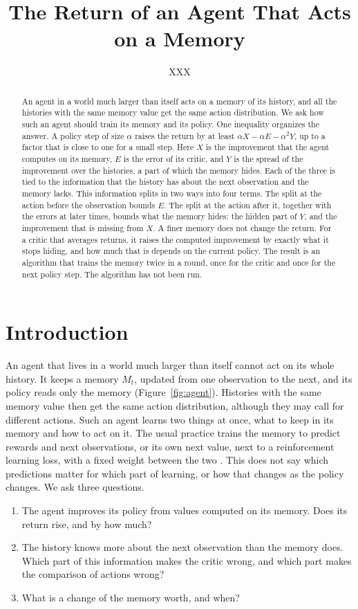 \documentclass{article}
\title{The Return of an Agent That Acts on a Memory}
\author{XXX}
\newcounter{algo}
\theoremstyle{definition}
\begin{document}
\maketitle

\begin{abstract}
An agent in a world much larger than itself acts on a memory of its history, and all the histories with the same memory value get the same action distribution. We ask how such an agent should train its memory and its policy. One inequality organizes the answer. A policy step of size $\alpha$ raises the return by at least $\alpha X-\alpha E-\alpha^2Y$, up to a factor that is close to one for a small step. Here $X$ is the improvement that the agent computes on its memory, $E$ is the error of its critic, and $Y$ is the spread of the improvement over the histories, a part of which the memory hides. Each of the three is tied to the information that the history has about the next observation and the memory lacks. This information splits in two ways into four terms. The split at the action before the observation bounds $E$. The split at the action after it, together with the errors at later times, bounds what the memory hides: the hidden part of $Y$, and the improvement that is missing from $X$. A finer memory does not change the return. For a critic that averages returns, it raises the computed improvement by exactly what it stops hiding, and how much that is depends on the current policy. The result is an algorithm that trains the memory twice in a round, once for the critic and once for the next policy step. The algorithm has not been run.
\end{abstract}

\section{Introduction}

An agent that lives in a world much larger than itself cannot act on its whole history. It keeps a memory $M_t$, updated from one observation to the next, and its policy reads only the memory (Figure~\ref{fig:agent}). Histories with the same memory value then get the same action distribution, although they may call for different actions. Such an agent learns two things at once, what to keep in its memory and how to act on it. The usual practice trains the memory to predict rewards and next observations, or its own next value, next to a reinforcement learning loss, with a fixed weight between the two \citep{subramanian2022approximate,ni2024bridging}. This does not say which predictions matter for which part of learning, or how that changes as the policy changes. We ask three questions.
\begin{enumerate}
\item The agent improves its policy from values computed on its memory. Does its return rise, and by how much?
\item The history knows more about the next observation than the memory does. Which part of this information makes the critic wrong, and which part makes the comparison of actions wrong?
\item What is a change of the memory worth, and when?
\end{enumerate}
\end{document}
